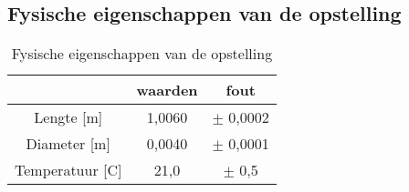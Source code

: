 \subsection{Fysische eigenschappen van de opstelling}


\begin{table}[h]
    \centering
    \caption{Fysische eigenschappen van de opstelling}
    \begin{tabular}{| c | c | c |}
        \hline
                        & waarden   & fout       \\ \hline
        Lengte [m]      & 1,0060    & $\pm$ 0,0002 \\ \hline
        Diameter [m]    & 0,0040    & $\pm$ 0,0001 \\ \hline
        Temperatuur [C] & 21,0      & $\pm$ 0,5    \\ \hline
        
    \end{tabular}
\end{table}


